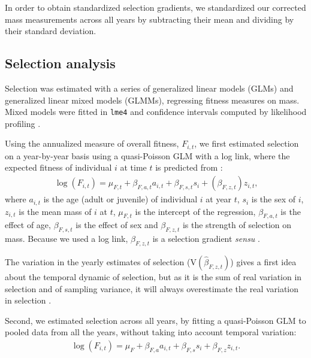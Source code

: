 In order to obtain standardized selection gradients, we standardized our corrected mass measurements across all years by subtracting their mean and dividing by their standard deviation.

\subsection*{Selection analysis}

Selection was estimated with a series of generalized linear models (GLMs) and  generalized linear mixed models (GLMMs), regressing fitness measures on mass. Mixed models were fitted in \texttt{lme4} and confidence intervals computed by likelihood profiling \parencite{Bates2014a}. 

Using the annualized measure of overall fitness, $F_{i,t}$, we first estimated selection on a year-by-year basis using a quasi-Poisson GLM with a log link, where the expected fitness of individual $i$ at time $t$ is predicted from : 
\begin{align}
\log(F_{i,t}) = \mu_{F,t} + \beta_{F,a,t} a_{i,t} + \beta_{F,s,t} s_{i} + (\beta_{F,z,t})z_{i,t} \text{,}
\label{eq:mod1}
\end{align}
where $a_{i,t}$ is the age (adult or juvenile) of individual $i$ at year $t$, $s_{i}$ is the sex of $i$, $z_{i,t}$ is the mean mass of $i$ at $t$, $\mu_{F,t}$ is the intercept of the regression, $\beta_{F,a,t}$ is the effect of age, $\beta_{F,s,t}$ is the effect of sex and $\beta_{F,z,t}$ is the strength of selection on mass. Because we used a log link, $\beta_{F,z,t}$ is a selection gradient \textit{sensu} \cite{Lande1983} \parencite{Smouse1999,Firth2015}.

The variation in the yearly estimates of selection ($\mathrm{V}(\hat{\beta}_{F,z,t})$) gives a first idea about the temporal dynamic of selection, but as it is the sum of real variation in selection and of sampling variance, it will always overestimate the real variation in selection \parencite{Morrissey2012flusel}.

Second, we estimated selection across all years, by fitting a quasi-Poisson GLM to pooled data from all the years, without taking into account temporal variation:
\begin{align}
\log(F_{i,t}) = \mu_{F} + \beta_{F,a} a_{i,t} + \beta_{F,s} s_{i} + \beta_{F,z} z_{i,t} \text{.}
\label{eq:modallyears}
\end{align}

